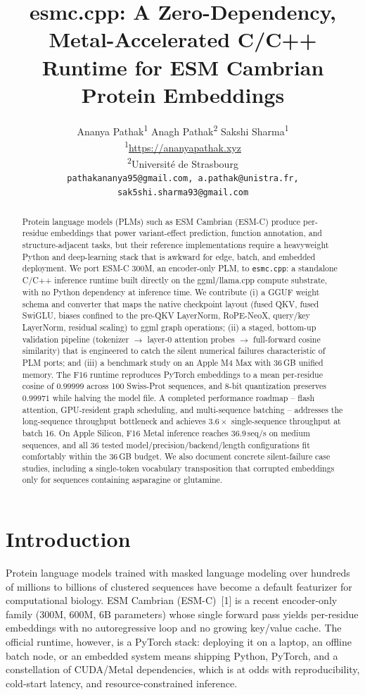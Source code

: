 \documentclass{article}
\title{esmc.cpp: A Zero-Dependency, Metal-Accelerated C/C++ Runtime for ESM Cambrian Protein Embeddings}
\author{%
  Ananya Pathak\textsuperscript{1} \And
  Anagh Pathak\textsuperscript{2} \And
  Sakshi Sharma\textsuperscript{1} \\
  \textsuperscript{1}\url{https://ananyapathak.xyz} \\
  \textsuperscript{2}Université de Strasbourg \\
  \texttt{pathakananya95@gmail.com, a.pathak@unistra.fr, sak5shi.sharma93@gmail.com} \\
}
\begin{document}
\maketitle

\begin{abstract}
Protein language models (PLMs) such as ESM Cambrian (ESM-C) produce per-residue embeddings that power variant-effect prediction, function annotation, and structure-adjacent tasks, but their reference implementations require a heavyweight Python and deep-learning stack that is awkward for edge, batch, and embedded deployment. We port ESM-C 300M, an encoder-only PLM, to \texttt{esmc.cpp}: a standalone C/C++ inference runtime built directly on the ggml/llama.cpp compute substrate, with no Python dependency at inference time. We contribute (i) a GGUF weight schema and converter that maps the native checkpoint layout (fused QKV, fused SwiGLU, biases confined to the pre-QKV LayerNorm, RoPE-NeoX, query/key LayerNorm, residual scaling) to ggml graph operations; (ii) a staged, bottom-up validation pipeline (tokenizer $\to$ layer-0 attention probes $\to$ full-forward cosine similarity) that is engineered to catch the silent numerical failures characteristic of PLM ports; and (iii) a benchmark study on an Apple M4 Max with 36\,GB unified memory. The F16 runtime reproduces PyTorch embeddings to a mean per-residue cosine of $0.99999$ across 100 Swiss-Prot sequences, and 8-bit quantization preserves $0.99971$ while halving the model file. A completed performance roadmap -- flash attention, GPU-resident graph scheduling, and multi-sequence batching -- addresses the long-sequence throughput bottleneck and achieves $3.6\times$ single-sequence throughput at batch 16. On Apple Silicon, F16 Metal inference reaches 36.9\,seq/s on medium sequences, and all 36 tested model/precision/backend/length configurations fit comfortably within the 36\,GB budget. We also document concrete silent-failure case studies, including a single-token vocabulary transposition that corrupted embeddings only for sequences containing asparagine or glutamine.
\end{abstract}

\section{Introduction}
\label{sec:intro}

Protein language models trained with masked language modeling over hundreds of millions to billions of clustered sequences have become a default featurizer for computational biology. ESM Cambrian (ESM-C)~[1] is a recent encoder-only family (300M, 600M, 6B parameters) whose single forward pass yields per-residue embeddings with no autoregressive loop and no growing key/value cache. The official runtime, however, is a PyTorch stack: deploying it on a laptop, an offline batch node, or an embedded system means shipping Python, PyTorch, and a constellation of CUDA/Metal dependencies, which is at odds with reproducibility, cold-start latency, and resource-constrained inference.
\end{document}
